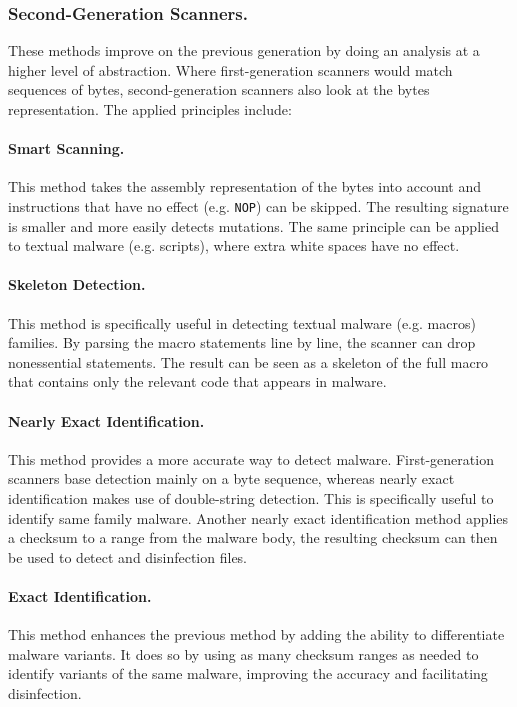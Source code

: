 \documentclass{llncs}
\begin{document}
\subsubsection{Second-Generation Scanners.} These methods improve on the previous generation by doing an analysis at a higher level of abstraction. Where first-generation scanners would match sequences of bytes, second-generation scanners also look at the bytes representation. The applied principles include:

\paragraph{Smart Scanning.} This method takes the assembly representation of the bytes into account and instructions that have no effect (e.g. \texttt{NOP}) can be skipped. The resulting signature is smaller and more easily detects mutations. The same principle can be applied to textual malware (e.g. scripts), where extra white spaces have no effect.

\paragraph{Skeleton Detection.} This method is specifically useful in detecting textual malware (e.g. macros) families. By parsing the macro statements line by line, the scanner can drop nonessential statements. The result can be seen as a skeleton of the full macro that contains only the relevant code that appears in malware.

\paragraph{Nearly Exact Identification.} This method provides a more accurate way to detect malware. First-generation scanners base detection mainly on a byte sequence, whereas nearly exact identification makes use of double-string detection. This is specifically useful to identify same family malware. Another nearly exact identification method applies a checksum to a range from the malware body, the resulting checksum can then be used to detect and disinfection files.

\paragraph{Exact Identification.} This method enhances the previous method by adding the ability to differentiate malware variants. It does so by using as many checksum ranges as needed to identify variants of the same malware, improving the accuracy and facilitating disinfection.\\
\end{document}
